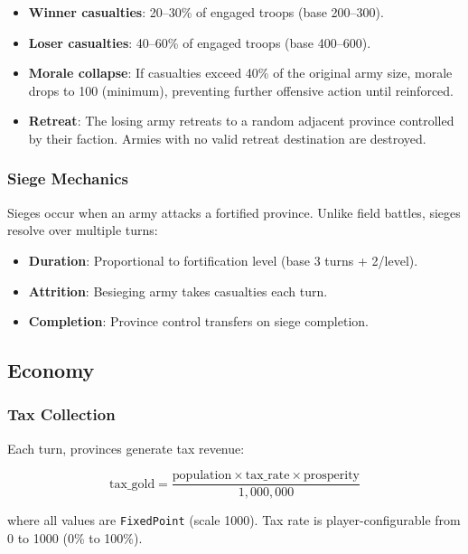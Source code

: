 \documentclass[a4paper, 11pt]{article}
\newcommand{\fp}{\texttt{FixedPoint}}
\begin{document}
\begin{itemize}
  \item \textbf{Winner casualties}: 20--30\% of engaged troops (base 200--300).
  \item \textbf{Loser casualties}: 40--60\% of engaged troops (base 400--600).
  \item \textbf{Morale collapse}: If casualties exceed 40\% of the original
    army size, morale drops to 100 (minimum), preventing further offensive
    action until reinforced.
  \item \textbf{Retreat}: The losing army retreats to a random adjacent
    province controlled by their faction. Armies with no valid retreat
    destination are destroyed.
\end{itemize}

\subsubsection{Siege Mechanics}

Sieges occur when an army attacks a fortified province. Unlike field battles,
sieges resolve over multiple turns:

\begin{itemize}
  \item \textbf{Duration}: Proportional to fortification level (base 3 turns + 2/level).
  \item \textbf{Attrition}: Besieging army takes casualties each turn.
  \item \textbf{Completion}: Province control transfers on siege completion.
\end{itemize}

\subsection{Economy}
\label{sec:economy}

\subsubsection{Tax Collection}

Each turn, provinces generate tax revenue:

\begin{equation}
  \text{tax\_gold} = \frac{\text{population} \times \text{tax\_rate} \times \text{prosperity}}{1{,}000{,}000}
\end{equation}

where all values are \fp{} (scale 1000). Tax rate is player-configurable
from 0 to 1000 (0\% to 100\%).
\end{document}
